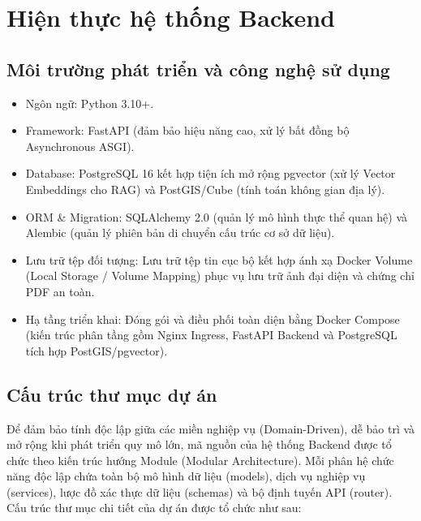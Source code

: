 \chapter{Hiện thực hệ thống Backend}

\section{Môi trường phát triển và công nghệ sử dụng}
\begin{itemize}
    \item Ngôn ngữ: Python 3.10+.

    \item Framework: FastAPI (đảm bảo hiệu năng cao, xử lý bất đồng bộ Asynchronous ASGI).
    
    \item Database: PostgreSQL 16 kết hợp tiện ích mở rộng pgvector (xử lý Vector Embeddings cho RAG) và PostGIS/Cube (tính toán không gian địa lý).
    
    \item ORM \& Migration: SQLAlchemy 2.0 (quản lý mô hình thực thể quan hệ) và Alembic (quản lý phiên bản di chuyển cấu trúc cơ sở dữ liệu).
    
    \item Lưu trữ tệp đối tượng: Lưu trữ tệp tin cục bộ kết hợp ánh xạ Docker Volume (Local Storage / Volume Mapping) phục vụ lưu trữ ảnh đại diện và chứng chỉ PDF an toàn.
    
    \item Hạ tầng triển khai: Đóng gói và điều phối toàn diện bằng Docker Compose (kiến trúc phân tầng gồm Nginx Ingress, FastAPI Backend và PostgreSQL tích hợp PostGIS/pgvector).
\end{itemize}

\clearpage
\section{Cấu trúc thư mục dự án}

Để đảm bảo tính độc lập giữa các miền nghiệp vụ (Domain-Driven), dễ bảo trì và mở rộng khi phát triển quy mô lớn, mã nguồn của hệ thống Backend được tổ chức theo kiến trúc hướng Module (Modular Architecture). Mỗi phân hệ chức năng độc lập chứa toàn bộ mô hình dữ liệu (models), dịch vụ nghiệp vụ (services), lược đồ xác thực dữ liệu (schemas) và bộ định tuyến API (router). Cấu trúc thư mục chi tiết của dự án được tổ chức như sau:

